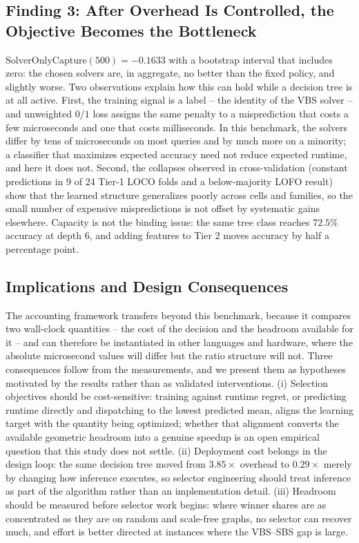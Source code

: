 \documentclass[conference]{IEEEtran}
\begin{document}
\subsection{Finding 3: After Overhead Is Controlled, the Objective Becomes the Bottleneck}
$\mathrm{SolverOnlyCapture}(500) = -0.1633$ with a bootstrap interval that includes zero: the chosen solvers are, in aggregate, no better than the fixed policy, and slightly worse. Two observations explain how this can hold while a decision tree is at all active. First, the training signal is a label -- the identity of the VBS solver -- and unweighted $0/1$ loss assigns the same penalty to a misprediction that costs a few microseconds and one that costs milliseconds. In this benchmark, the solvers differ by tens of microseconds on most queries and by much more on a minority; a classifier that maximizes expected accuracy need not reduce expected runtime, and here it does not. Second, the collapses observed in cross-validation (constant predictions in 9 of 24 Tier-1 LOCO folds and a below-majority LOFO result) show that the learned structure generalizes poorly across cells and families, so the small number of expensive mispredictions is not offset by systematic gains elsewhere. Capacity is not the binding issue: the same tree class reaches $72.5\%$ accuracy at depth 6, and adding features to Tier 2 moves accuracy by half a percentage point.

\subsection{Implications and Design Consequences}
The accounting framework transfers beyond this benchmark, because it compares two wall-clock quantities -- the cost of the decision and the headroom available for it -- and can therefore be instantiated in other languages and hardware, where the absolute microsecond values will differ but the ratio structure will not. Three consequences follow from the measurements, and we present them as hypotheses motivated by the results rather than as validated interventions. (i) Selection objectives should be cost-sensitive: training against runtime regret, or predicting runtime directly and dispatching to the lowest predicted mean, aligns the learning target with the quantity being optimized; whether that alignment converts the available geometric headroom into a genuine speedup is an open empirical question that this study does not settle. (ii) Deployment cost belongs in the design loop: the same decision tree moved from $3.85\times$ overhead to $0.29\times$ merely by changing how inference executes, so selector engineering should treat inference as part of the algorithm rather than an implementation detail. (iii) Headroom should be measured before selector work begins: where winner shares are as concentrated as they are on random and scale-free graphs, no selector can recover much, and effort is better directed at instances where the VBS--SBS gap is large.
\end{document}
